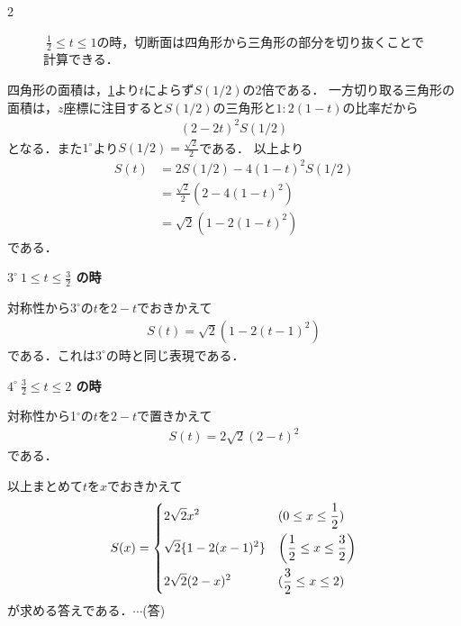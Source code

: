 \documentclass[../../../../main.tex]{subfiles}
\begin{document}
\begin{multicols}{2}
\begin{figure}[H]
    \caption{$\ \frac{1}{2} \le t \le 1$の時，切断面は四角形から三角形の部分を切り抜くことで計算できる．}
    \label{2000-4:fig:4}
  \end{figure}

  四角形の面積は，\cref{2000-4:fig:4}より$t$によらず$S(1/2)$の2倍である．
  一方切り取る三角形の面積は，$z$座標に注目すると$S(1/2)$の三角形と$1:2(1-t)$の比率だから
  \begin{align*}
    (2-2t)^2S(1/2)
  \end{align*}
  となる．また$1^{\circ}$より$S(1/2)=\frac{\sqrt{2}}{2}$である．
  以上より
  \begin{align*}
    S(t)
     & = 2S(1/2) - 4(1-t)^2S(1/2)                  \\
     & = \frac{\sqrt{2}}{2}\left(2-4(1-t)^2\right) \\
     & = \sqrt{2}\left(1-2(1-t)^2\right)
  \end{align*}
  である．

  \vspace{1em}
  \textbf{$3^\circ \ 1 \le t \le \frac{3}{2}$ の時}

  対称性から$3^\circ$の$t$を$2-t$でおきかえて
  \begin{align*}
    S(t) = \sqrt{2}\left(1-2(t-1)^2\right)
  \end{align*}
  である．これは$3^\circ$の時と同じ表現である．

  \vspace{1em} %
  \textbf{$4^\circ \ \frac{3}{2} \le t \le 2$ の時}

  対称性から1$^\circ$の$t$を$2-t$で置きかえて
  \begin{align*}
    S(t) = 2\sqrt{2}(2-t)^2
  \end{align*}
  である．

  \vspace{1em} %
  以上まとめて$t$を$x$でおきかえて
  \begin{align*}
    S(x)
    = \begin{dcases}
        2\sqrt{2}x^2           & (0 \le x \le \frac{1}{2})                      \\
        \sqrt{2}\{1-2(x-1)^2\} & \left(\frac{1}{2} \le x \le \frac{3}{2}\right) \\
        2\sqrt{2}(2-x)^2       & (\frac{3}{2} \le x \le 2)
      \end{dcases}
  \end{align*}
  が求める答えである．$\cdots$(答)


\end{multicols}
\end{document}
